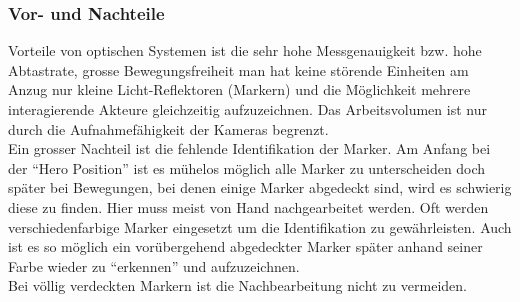 \subsubsection{Vor- und Nachteile}

Vorteile von optischen Systemen ist die sehr hohe Messgenauigkeit bzw. hohe Abtastrate, grosse Bewegungsfreiheit man hat keine störende Einheiten am Anzug nur kleine Licht-Reflektoren (Markern) und die Möglichkeit mehrere interagierende Akteure gleichzeitig aufzuzeichnen. Das Arbeitsvolumen ist nur durch die Aufnahmefähigkeit der Kameras begrenzt. \\
Ein grosser Nachteil ist die fehlende Identifikation der Marker. Am Anfang bei der ``Hero Position'' ist es mühelos möglich alle Marker zu unterscheiden doch später bei Bewegungen, bei denen einige Marker abgedeckt sind, wird es schwierig diese zu finden. Hier muss meist von Hand nachgearbeitet werden. Oft werden verschiedenfarbige Marker eingesetzt um die Identifikation zu gewährleisten. Auch ist es so möglich ein vorübergehend abgedeckter Marker später anhand seiner Farbe wieder zu ``erkennen'' und aufzuzeichnen. \\
Bei völlig verdeckten Markern ist die Nachbearbeitung nicht zu vermeiden. 

